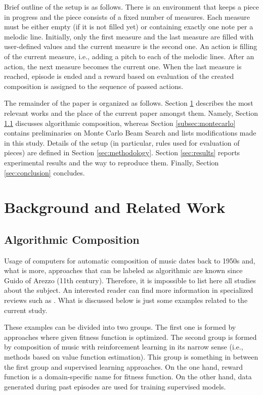 \documentclass{article}
\begin{document}
Brief outline of the setup is as follows. There is an environment that keeps a piece in progress and the piece consists of a fixed number of measures. Each measure must be either empty (if it is not filled yet) or containing exactly one note per a melodic line. Initially, only the first measure and the last measure are filled with user-defined values and the current measure is the second one. An action is filling of the current measure, i.e., adding a pitch to each of the melodic lines. After an action, the next measure becomes the current one. When the last measure is reached, episode is ended and a reward based on evaluation of the created composition is assigned to the sequence of passed actions.

The remainder of the paper is organized as follows. Section \ref{sec:literature} describes the most relevant works and the place of the current paper amongst them. Namely, Section \ref{subsec:composition} discusses algorithmic composition, whereas Section \ref{subsec:montecarlo} contains preliminaries on Monte Carlo Beam Search and lists modifications made in this study. Details of the setup (in particular, rules used for evaluation of pieces) are defined in Section \ref{sec:methodology}. Section \ref{sec:results} reports experimental results and the way to reproduce them. Finally, Section \ref{sec:conclusion} concludes.


\section{Background and Related Work}
\label{sec:literature}

\subsection{Algorithmic Composition}
\label{subsec:composition}

Usage of computers for automatic composition of music dates back to 1950s and, what is more, approaches that can be labeled as algorithmic are known since Guido of Arezzo (11th century). Therefore, it is impossible to list here all studies about the subject. An interested reader can find more information in specialized reviews such as \cite{fernandez2013ai}. What is discussed below is just some examples related to the current study.

These examples can be divided into two groups. The first one is formed by approaches where given fitness function is optimized.  The second group is formed by composition of music with reinforcement learning in its narrow sense (i.e., methods based on value function estimation). This group is something in between the first group and supervised learning approaches. On the one hand, reward function is a domain-specific name for fitness function. On the other hand, data generated during past episodes are used for training supervised models.
\end{document}
